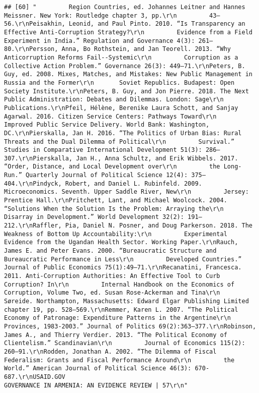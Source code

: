\documentclass[
]{article}
\begin{document}
\begin{verbatim}
## [60] "         Region Countries, ed. Johannes Leitner and Hannes Meissner. New York: Routledge chapter 3, pp.\r\n         43–56.\r\nPeisakhin, Leonid, and Paul Pinto. 2010. “Is Transparency an Effective Anti-Corruption Strategy?\r\n         Evidence from a Field Experiment in India.” Regulation and Governance 4(3): 261–80.\r\nPersson, Anna, Bo Rothstein, and Jan Teorell. 2013. “Why Anticorruption Reforms Fail--Systemic\r\n         Corruption as a Collective Action Problem.” Governance 26(3): 449–71.\r\nPeters, B. Guy, ed. 2008. Mixes, Matches, and Mistakes: New Public Management in Russia and the Former\r\n       Soviet Republics. Budapest: Open Society Institute.\r\nPeters, B. Guy, and Jon Pierre. 2018. The Next Public Administration: Debates and Dilemmas. London: Sage\r\n       Publications.\r\nPfeil, Hélène, Berenike Laura Schott, and Sanjay Agarwal. 2016. Citizen Service Centers: Pathways Toward\r\n         Improved Public Service Delivery. World Bank: Washington, DC.\r\nPierskalla, Jan H. 2016. “The Politics of Urban Bias: Rural Threats and the Dual Dilemma of Political\r\n         Survival.” Studies in Comparative International Development 51(3): 286–307.\r\nPierskalla, Jan H., Anna Schultz, and Erik Wibbels. 2017. “Order, Distance, and Local Development over\r\n         the Long-Run.” Quarterly Journal of Political Science 12(4): 375–404.\r\nPindyck, Robert, and Daniel L. Rubinfeld. 2009. Microeconomics. Seventh. Upper Saddle River, New\r\n         Jersey: Prentice Hall.\r\nPritchett, Lant, and Michael Woolcock. 2004. “Solutions When the Solution Is the Problem: Arraying the\r\n       Disarray in Development.” World Development 32(2): 191–212.\r\nRaffler, Pia, Daniel N. Posner, and Doug Parkerson. 2018. The Weakness of Bottom Up Accountability:\r\n         Experimental Evidence from the Ugandan Health Sector. Working Paper.\r\nRauch, James E. and Peter Evans. 2000. “Bureaucratic Structure and Bureaucratic Performance in Less\r\n         Developed Countries.” Journal of Public Economics 75(1):49–71.\r\nRecanatini, Francesca. 2011. Anti-Corruption Authorities: An Effective Tool to Curb Corruption? In\r\n         Internal Handbook on the Economics of Corruption, Volume Two, ed. Susan Rose-Ackerman and Tina\r\n         Søreide. Northampton, Massachusetts: Edward Elgar Publishing Limited chapter 19, pp. 528–569.\r\nRemmer, Karen L. 2007. “The Political Economy of Patronage: Expenditure Patterns in the Argentine\r\n         Provinces, 1983-2003.” Journal of Politics 69(2):363–377.\r\nRobinson, James A., and Thierry Verdier. 2013. “The Political Economy of Clientelism.” Scandinavian\r\n         Journal of Economics 115(2): 260–91.\r\nRodden, Jonathan A. 2002. “The Dilemma of Fiscal Federalism: Grants and Fiscal Performance Around\r\n         the World.” American Journal of Political Science 46(3): 670-687.\r\nUSAID.GOV                                                     GOVERNANCE IN ARMENIA: AN EVIDENCE REVIEW | 57\r\n"                                                                                                                                                                                                                                                                                                                                                      
\end{verbatim}
\end{document}
